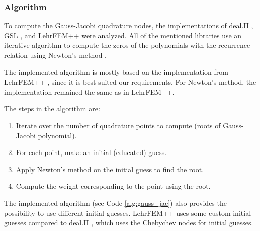 \subsubsection*{Algorithm}

To compute the Gauss-Jacobi quadrature nodes, the implementations of deal.II \cite{bangerth_dealiigeneral-purpose_2007},
GSL \cite{gough_gnu_2009}, and LehrFEM++ \cite{craffael_lehrfem_2023} were analyzed.
All of the mentioned libraries use an iterative algorithm to compute the zeros of the polynomials
with the recurrence relation using Newton's method \cite[Chapter~8.5]{hiptmair_numerical_2020}.

The implemented algorithm is mostly based on the implementation from LehrFEM++ \cite{craffael_lehrfem_2023},
since it is best suited our requirements.
For Newton's method, the implementation remained the same as in LehrFEM++.

The steps in the algorithm are:
\begin{enumerate}
    \item Iterate over the number of quadrature points to compute (roots of Gauss-Jacobi polynomial).
    \item For each point, make an initial (educated) guess.
    \item Apply Newton's method on the initial guess to find the root.
    \item Compute the weight corresponding to the point using the root.
\end{enumerate}

The implemented algorithm (see Code \ref{alg:gauss_jac}) also provides the possibility to use different initial guesses.
LehrFEM++ \cite{craffael_lehrfem_2023} uses some custom initial guesses compared to deal.II \cite{bangerth_dealiigeneral-purpose_2007},
which uses the Chebychev nodes for initial guesses.

